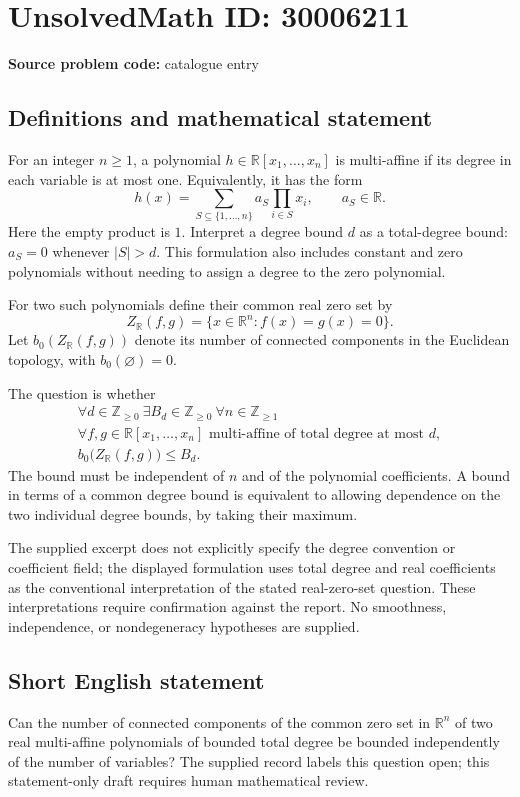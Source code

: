 \documentclass[11pt]{article}
\newcommand{\Z}{\mathbb{Z}}
\newcommand{\R}{\mathbb{R}}
\begin{document}
\section*{UnsolvedMath ID: 30006211}
\textbf{Source problem code:} catalogue entry
\subsection{Definitions and mathematical statement}
For an integer \(n\geq 1\), a polynomial \(h\in\R[x_1,\ldots,x_n]\) is multi-affine if its degree in each variable is at most one. Equivalently, it has the form
\[
h(x)=\sum_{S\subseteq\{1,\ldots,n\}}a_S\prod_{i\in S}x_i,\qquad a_S\in\R.
\]
Here the empty product is \(1\). Interpret a degree bound \(d\) as a total-degree bound: \(a_S=0\) whenever \(|S|>d\). This formulation also includes constant and zero polynomials without needing to assign a degree to the zero polynomial.

For two such polynomials define their common real zero set by
\[
Z_{\R}(f,g)=\{x\in\R^n:f(x)=g(x)=0\}.
\]
Let \(b_0(Z_{\R}(f,g))\) denote its number of connected components in the Euclidean topology, with \(b_0(\varnothing)=0\).

The question is whether
\[
\begin{gathered}
\forall d\in\Z_{\geq0}\ \exists B_d\in\Z_{\geq0}\ \forall n\in\Z_{\geq1}\ \\
\forall f,g\in\R[x_1,\ldots,x_n]\text{ multi-affine of total degree at most }d,\\
b_0\bigl(Z_{\R}(f,g)\bigr)\leq B_d.
\end{gathered}
\]
The bound must be independent of \(n\) and of the polynomial coefficients. A bound in terms of a common degree bound is equivalent to allowing dependence on the two individual degree bounds, by taking their maximum.

The supplied excerpt does not explicitly specify the degree convention or coefficient field; the displayed formulation uses total degree and real coefficients as the conventional interpretation of the stated real-zero-set question. These interpretations require confirmation against the report. No smoothness, independence, or nondegeneracy hypotheses are supplied.
\subsection{Short English statement}
Can the number of connected components of the common zero set in \(\R^n\) of two real multi-affine polynomials of bounded total degree be bounded independently of the number of variables? The supplied record labels this question open; this statement-only draft requires human mathematical review.
\end{document}
